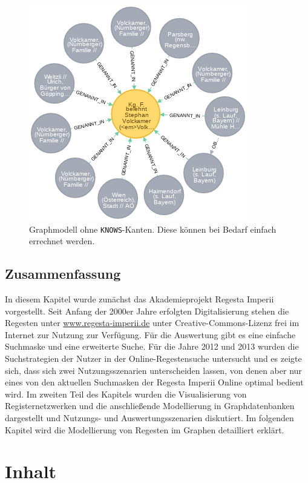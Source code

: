 \documentclass[ngerman,]{scrreprt}
\begin{document}
\begin{figure}
\centering
\includegraphics{Bilder/1zu1-Beziehungen-nur-Regest.png}
\caption{Graphmodell ohne \texttt{KNOWS}-Kanten. Diese können bei Bedarf einfach errechnet werden.}
\end{figure}

\hypertarget{zusammenfassung-1}{%
\section{Zusammenfassung}\label{zusammenfassung-1}}

In diesem Kapitel wurde zunächst das Akademieprojekt Regesta Imperii vorgestellt. Seit Anfang der 2000er Jahre erfolgten Digitalisierung stehen die Regesten unter \url{www.regesta-imperii.de} unter Creative-Commons-Lizenz frei im Internet zur Nutzung zur Verfügung. Für die Auswertung gibt es eine einfache Suchmaske und eine erweiterte Suche. Für die Jahre 2012 und 2013 wurden die Suchstrategien der Nutzer in der Online-Regestensuche untersucht und es zeigte sich, dass sich zwei Nutzungsszenarien unterscheiden lassen, von denen aber nur eines von den aktuellen Suchmasken der Regesta Imperii Online optimal bedient wird. Im zweiten Teil des Kapitels wurden die Visualisierung von Registernetzwerken und die anschließende Modellierung in Graphdatenbanken dargestellt und Nutzungs- und Auswertungsszenarien diskutiert. Im folgenden Kapitel wird die Modellierung von Regesten im Graphen detailliert erklärt.

\hypertarget{inhalt-3}{%
\chapter{Inhalt}\label{inhalt-3}}
\end{document}

